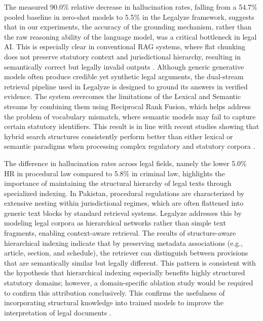 \hspace*{2em}The measured 90.0\% relative decrease in hallucination rates, falling from a 54.7\% pooled baseline in zero-shot models to 5.5\% in the Legalyze framework, suggests
that in our experiments, the accuracy of the grounding mechanism, rather than the raw
reasoning ability of the language model, was a critical bottleneck in legal AI. This is
especially clear in conventional RAG systems, where flat chunking does not preserve
statutory context and jurisdictional hierarchy, resulting in semantically correct but
legally invalid outputs \cite{r607,r45}. Although generic generative models often produce
credible yet synthetic legal arguments, the dual-stream retrieval pipeline used in
Legalyze is designed to ground its answers in verified evidence. The system overcomes
the limitations of the Lexical and Semantic streams by combining them using Reciprocal
Rank Fusion, which helps address the problem of vocabulary mismatch, where semantic
models may fail to capture certain statutory identifiers. This result is in line with
recent studies showing that hybrid search structures consistently perform better than
either lexical or semantic paradigms when processing complex regulatory and statutory
corpora \cite{r606}.

\hspace*{2em}The difference in hallucination rates across legal fields, namely the lower 5.0\% HR in procedural law compared to 5.8\% in criminal law, highlights the
importance of maintaining the structural hierarchy of legal texts through specialized
indexing. In Pakistan, procedural regulations are characterized by extensive nesting
within jurisdictional regimes, which are often flattened into generic text blocks by
standard retrieval systems. Legalyze addresses this by modeling legal corpora as
hierarchical networks rather than simple text fragments, enabling context-aware
retrieval. The results of structure-aware hierarchical indexing indicate that by
preserving metadata associations (e.g., article, section, and schedule), the retriever
can distinguish between provisions that are semantically similar but legally different.
This pattern is consistent with the hypothesis that hierarchical indexing especially
benefits highly structured statutory domains; however, a domain-specific ablation study
would be required to confirm this attribution conclusively. This confirms the
usefulness of incorporating structural knowledge into trained models to improve the
interpretation of legal documents \cite{r604}. 

